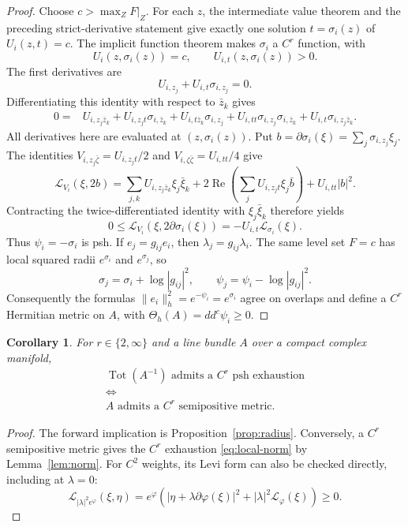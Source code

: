 \documentclass[11pt]{amsart}
\newtheorem{corollary}[theorem]{Corollary}
\theoremstyle{definition}
\theoremstyle{remark}
\numberwithin{equation}{section}
\newcommand{\Tot}{\operatorname{Tot}}
\newcommand{\ddc}{dd^c}
\newcommand{\Levi}{\mathcal L}
\begin{document}
\begin{proof}
Choose $c>\max_ZF|_Z$. For each $z$, the intermediate value
theorem and the preceding strict-derivative statement give exactly
one solution $t=\sigma_i(z)$ of $U_i(z,t)=c$.
The implicit function theorem makes $\sigma_i$ a $C^r$ function,
with
\begin{equation}\label{eq:implicit-radius}
 U_i(z,\sigma_i(z))=c,\qquad U_{i,t}(z,\sigma_i(z))>0.
\end{equation}
The first derivatives are
\[
 U_{i,z_j}+U_{i,t}\sigma_{i,z_j}=0.
\]
Differentiating this identity with respect to $\bar z_k$ gives
\begin{align*}
 0={}&U_{i,z_j\bar z_k}+U_{i,z_jt}\sigma_{i,\bar z_k}
 +U_{i,t\bar z_k}\sigma_{i,z_j}
 +U_{i,tt}\sigma_{i,z_j}\sigma_{i,\bar z_k}
 +U_{i,t}\sigma_{i,z_j\bar z_k}.
\end{align*}
All derivatives here are evaluated at $(z,\sigma_i(z))$.
Put $b=\partial\sigma_i(\xi)=\sum_j\sigma_{i,z_j}\xi_j$.
The identities
$V_{i,z_j\bar\zeta}=U_{i,z_jt}/2$ and
$V_{i,\zeta\bar\zeta}=U_{i,tt}/4$ give
\[
 \Levi_{V_i}(\xi,2b)
 =\sum_{j,k}U_{i,z_j\bar z_k}\xi_j\bar\xi_k
  +2\operatorname{Re}\!\left(\sum_jU_{i,z_jt}\xi_j\bar b\right)
  +U_{i,tt}|b|^2.
\]
Contracting the twice-differentiated identity with
$\xi_j\bar\xi_k$ therefore yields
\begin{equation}\label{eq:radius-Levi}
 0\le\Levi_{V_i}(\xi,2\partial\sigma_i(\xi))
 =-U_{i,t}\Levi_{\sigma_i}(\xi).
\end{equation}
Thus $\psi_i=-\sigma_i$ is psh. If $e_j=g_{ij}e_i$, then
$\lambda_j=g_{ij}\lambda_i$. The same level set $F=c$ has local
squared radii $e^{\sigma_i}$ and $e^{\sigma_j}$, so
\[
 \sigma_j=\sigma_i+\log|g_{ij}|^2,\qquad
 \psi_j=\psi_i-\log|g_{ij}|^2.
\]
Consequently the formulas
$\|e_i\|_h^2=e^{-\psi_i}=e^{\sigma_i}$ agree on overlaps and
define a $C^r$ Hermitian metric on $A$, with
$\Theta_h(A)=\ddc\psi_i\ge0$.
\end{proof}

\begin{corollary}\label{cor:criterion}
For $r\in\{2,\infty\}$ and a line bundle $A$ over a compact complex
manifold,
\[
\begin{gathered}
 \Tot(A^{-1})\text{ admits a }C^r\text{ psh exhaustion}
 \\\Longleftrightarrow\\
 A\text{ admits a }C^r\text{ semipositive metric}.
\end{gathered}
\]
\end{corollary}
\begin{proof}
The forward implication is Proposition~\ref{prop:radius}.
Conversely, a $C^r$ semipositive metric gives the $C^r$ exhaustion
\eqref{eq:local-norm} by Lemma~\ref{lem:norm}. For $C^2$ weights,
its Levi form can also be checked directly, including at $\lambda=0$:
\[
 \Levi_{|\lambda|^2e^\varphi}(\xi,\eta)
 =e^\varphi\left(
    |\eta+\lambda\partial\varphi(\xi)|^2
    +|\lambda|^2\Levi_\varphi(\xi)\right)\ge0.
\]
\end{proof}
\end{document}
